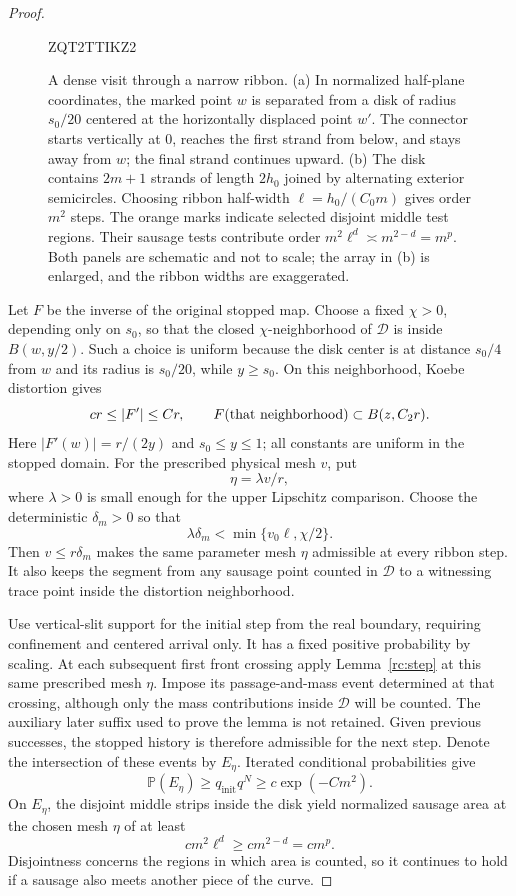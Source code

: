 \documentclass[11pt]{article}
\theoremstyle{definition}
\theoremstyle{remark}
\numberwithin{equation}{section}
\begin{document}
\begin{proof}
\begin{figure}[!htbp]
\begingroup
{}
ZQT2TTIKZ2
\endgroup

\caption{
A dense visit through a narrow ribbon. (a) In normalized half-plane coordinates, the marked point $w$ is separated from a disk of radius $s_0/20$ centered at the horizontally displaced point $w'$. The connector starts vertically at $0$, reaches the first strand from below, and stays away from $w$; the final strand continues upward. (b) The disk contains $2m+1$ strands of length $2h_0$ joined by alternating exterior semicircles. Choosing ribbon half-width $\ell=h_0/(C_0m)$ gives order $m^2$ steps. The orange marks indicate selected disjoint middle test regions. Their sausage tests contribute order $m^2\ell^d\asymp m^{2-d}=m^p$. Both panels are schematic and not to scale; the array in (b) is enlarged, and the ribbon widths are exaggerated.
}
\label{fig:serpentine-ribbon}
\end{figure}

Let $F$ be the inverse of the original stopped map. Choose a fixed
$\chi>0$, depending only on $s_0$, so that the closed
$\chi$-neighborhood of $\mathcal D$ is inside $B(w,y/2)$. Such a
choice is uniform because the disk center is at distance $s_0/4$
from $w$ and its radius is $s_0/20$, while $y\ge s_0$.
On this neighborhood, Koebe distortion gives
\[
 c r\le |F'|\le C r,
 \qquad F(\hbox{that neighborhood})\subset B(z,C_2r).
\]
Here $|F'(w)|=r/(2y)$ and $s_0\le y\le1$; all constants are uniform
in the stopped domain. For the prescribed physical mesh $v$, put
\[
                     \eta=\lambda v/r,
\]
where $\lambda>0$ is small enough for the upper Lipschitz comparison.
Choose the deterministic $\delta_m>0$ so that
\[
 \lambda\delta_m<\min\{v_0\ell,\chi/2\}.
\]
Then $v\le r\delta_m$ makes the same parameter mesh $\eta$ admissible
at every ribbon step. It also keeps the segment from any sausage point
counted in $\mathcal D$ to a witnessing trace point inside the
distortion neighborhood.

Use vertical-slit support for the initial step from the real boundary,
requiring confinement and centered arrival only.  It has a fixed
positive probability by scaling.  At each subsequent first front
crossing apply Lemma~\ref{rc:step} at this same prescribed mesh
$\eta$. Impose its passage-and-mass event determined at that crossing,
although only the mass contributions inside $\mathcal D$ will be
counted. The auxiliary later suffix used to prove the lemma is not
retained. Given previous successes, the stopped history is therefore
admissible for the next step. Denote the intersection of these events
by $E_\eta$.
Iterated conditional probabilities give
\[
 \mathbb P(E_\eta)\ge q_{\mathrm{init}}q^N
           \ge c\exp(-Cm^2).
\]
On $E_\eta$, the disjoint middle strips inside the disk yield
normalized sausage area at the chosen mesh $\eta$ of at least
\begin{equation}\label{rc:layout-sum}
 c m^2\ell^d\ge c m^{2-d}=c m^p.
\end{equation}
Disjointness concerns the regions in which area is counted, so it
continues to hold if a sausage also meets another piece of the curve.


\end{proof}
\end{document}
